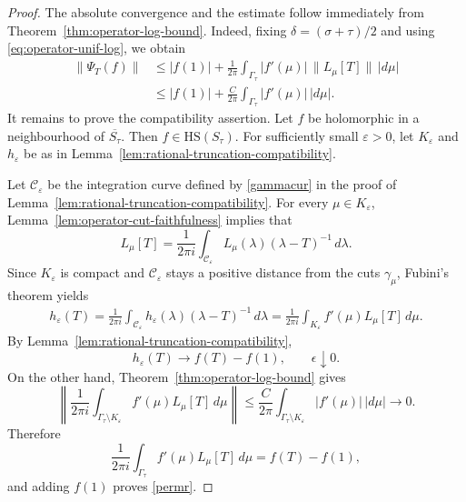\documentclass[11pt]{amsart}
\numberwithin{equation}{section}
\theoremstyle{definition}
\theoremstyle{plain}
\newcommand{\HS}{\mathrm{HS}}
\begin{document}
\begin{proof}
The absolute convergence and the estimate follow immediately from
Theorem~\ref{thm:operator-log-bound}.  Indeed, fixing $\delta=(\sigma+\tau)/2$  
and using \eqref{eq:operator-unif-log}, we obtain
\[
\begin{aligned}
        \|\Psi_T(f)\|
        &\le
        |f(1)|
        +
        \frac1{2\pi}
        \int_{\Gamma_\tau}|f'(\mu)|\,\|L_\mu[T]\|\,|d\mu| \\
        &\le
        |f(1)|
        +
        \frac{C}{2\pi}
        \int_{\Gamma_\tau}|f'(\mu)|\,|d\mu| .
\end{aligned}
\]
It remains to prove the compatibility assertion. Let \(f\) be holomorphic in
a neighbourhood of \(\overline{S_\tau}\). Then \(f\in\HS(S_\tau)\).
For sufficiently small \(\varepsilon>0\), let \(K_\varepsilon\) and
\(h_\varepsilon\) be as in
Lemma~\ref{lem:rational-truncation-compatibility}.

Let \(\mathcal C_\varepsilon\) be the integration curve defined by
\eqref{gammacur} in the proof of
Lemma~\ref{lem:rational-truncation-compatibility}.
For every
$\mu\in K_\varepsilon$, Lemma~\ref{lem:operator-cut-faithfulness} implies that
\[
        L_\mu[T]=
        \frac1{2\pi i}
        \int_{\mathcal C_{\varepsilon}}
             L_\mu(\lambda)(\lambda-T)^{-1}\,d\lambda.
\]
Since \(K_\varepsilon\) is compact and
\(\mathcal C_\varepsilon\) stays a positive distance from the cuts
\(\gamma_\mu\), Fubini's theorem yields
\[
\begin{aligned}
        h_\varepsilon(T)
        =
        \frac1{2\pi i}
        \int_{\mathcal C_{\varepsilon}}
             h_\varepsilon(\lambda)(\lambda-T)^{-1}\,d\lambda       
        =
        \frac1{2\pi i}
        \int_{K_\varepsilon}f'(\mu)L_\mu[T]\,d\mu .
\end{aligned}
\]
By Lemma~\ref{lem:rational-truncation-compatibility},
\[
        h_\varepsilon(T)\longrightarrow f(T)-f(1), \qquad \epsilon \downarrow 0.
\]
On the other hand, Theorem~\ref{thm:operator-log-bound} gives
\[
        \left\|
        \frac1{2\pi i}
        \int_{\Gamma_\tau\setminus K_\varepsilon}
             f'(\mu)L_\mu[T]\,d\mu
        \right\|
        \le
        \frac{C}{2\pi}
        \int_{\Gamma_\tau\setminus K_\varepsilon}|f'(\mu)|\,|d\mu|
        \longrightarrow0 .
\]
Therefore
\[
        \frac1{2\pi i}
        \int_{\Gamma_\tau}f'(\mu)L_\mu[T]\,d\mu
        =f(T)-f(1),
\]
and adding $f(1)$ proves \eqref{permr}.
\end{proof}
\end{document}
